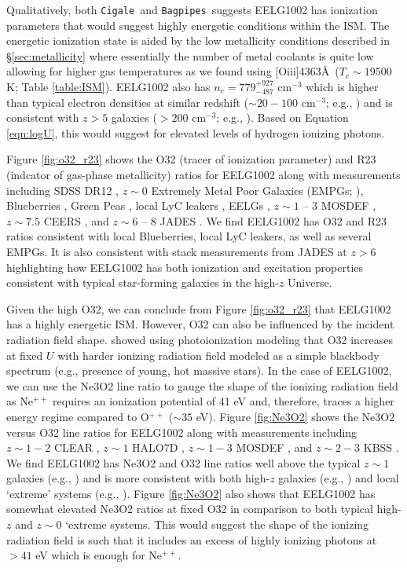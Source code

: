 \documentclass[twocolumn,tight,times,linenumbers]{aastex631}
\newcommand{\oiii}{[O{\sc iii}]}
\newcommand{\cigale}{\texttt{Cigale}}
\newcommand{\bagpipes}{\texttt{Bagpipes}}
\begin{document}
		Qualitatively, both \cigale~and \bagpipes~suggests EELG1002 has ionization parameters that would suggest highly energetic conditions within the ISM. The energetic ionization state is aided by the low metallicity conditions described in \S\ref{sec:metallicity} where essentially the number of metal coolants is quite low allowing for higher gas temperatures as we found using \oiii4363\AA~($T_e \sim 19500$ K; Table \ref{table:ISM}). EELG1002 also has $n_e = 779^{+927}_{-487}$ cm$^{-3}$ which is higher than typical electron densities at similar redshift ($\sim 20 - 100$ cm$^{-3}$; e.g., \citealt{Kaasinen2017,Swinbank2019, Davies2021}) and is consistent with $z > 5$ galaxies ($> 200$ cm$^{-3}$; e.g., \citealt{Isobe2023}). Based on Equation \ref{eqn:logU}, this would suggest for elevated levels of hydrogen ionizing photons. 
		
		Figure \ref{fig:o32_r23} shows the O32 (tracer of ionization parameter) and R23 (indcator of gas-phase metallicity) ratios for EELG1002 along with measurements including SDSS DR12 \citep{Thomas2013}, $z \sim 0$ Extremely Metal Poor Galaxies (EMPGs; \citealt{Nishigaki2023}), Blueberries \citep{Yang2017_BB}, Green Peas \citep{Yang2017_GP}, local LyC leakers \citep{Izotov2016,Izotov2018}, EELGs \citep{Amorin2015}, $z \sim 1$ -- 3 MOSDEF \citep{Kriek2015}, $z \sim 7.5$ CEERS \citep{Sanders2023,Tang2023}, and $z \sim 6$ -- 8 JADES \citep{Cameron2023}. We find EELG1002 has O32 and R23 ratios consistent with local Blueberries, local LyC leakers, as well as several EMPGs. It is also consistent with stack measurements from JADES at $z > 6$ highlighting how EELG1002 has both ionization and excitation properties consistent with typical star-forming galaxies in the high-$z$ Universe. 
		
		Given the high O32, we can conclude from Figure \ref{fig:o32_r23} that EELG1002 has a highly energetic ISM. However, O32 can also be influenced by the incident radiation field shape. \citet{Sanders2016} showed using photoionization modeling that O32 increases at fixed $U$ with harder ionizing radiation field modeled as a simple blackbody spectrum (e.g., presence of young, hot massive stars). In the case of EELG1002, we can use the Ne3O2 line ratio to gauge the shape of the ionizing radiation field as Ne$^{++}$ requires an ionization potential of 41 eV and, therefore, traces a higher energy regime compared to O$^{++}$ ($\sim 35$ eV). Figure \ref{fig:Ne3O2} shows the Ne3O2 versus O32 line ratios for EELG1002 along with measurements including $z \sim 1 - 2$ CLEAR \citep{Papovich2023}, $z \sim 1$ HALO7D \citep{Pharo2023}, $z \sim 1 - 3$ MOSDEF \citep{Jeong2020}, and $z \sim 2 - 3$ KBSS \citep{Strom2017}. We find EELG1002 has Ne3O2 and O32 line ratios well above the typical $z \sim 1$ galaxies (e.g., \citealt{Pharo2023}) and is more consistent with both high-$z$ galaxies (e.g., \citealt{Cameron2023,Tang2023}) and local `extreme' systems (e.g., \citealt{Izotov2016,Izotov2018,Yang2017_BB}). Figure \ref{fig:Ne3O2} also shows that EELG1002 has somewhat elevated Ne3O2 ratios at fixed O32 in comparison to both typical high-$z$ and $z \sim 0$ `extreme systems. This would suggest the shape of the ionizing radiation field is such that it includes an excess of highly ionizing photons at $> 41$ eV which is enough for Ne$^{++}$. 
		
\end{document}

